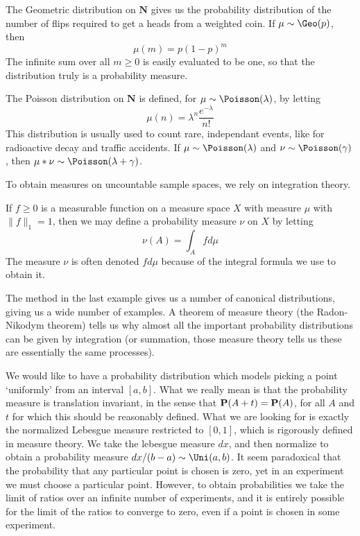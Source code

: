 \begin{example}
    The Geometric distribution on $\mathbf{N}$ gives us the probability distribution of the number of flips required to get a heads from a weighted coin. If $\mu \sim \Geo(p)$, then
    \[ \mu(m) = p (1-p)^m \]
    The infinite sum over all $m \geq 0$ is easily evaluated to be one, so that the distribution truly is a probability measure.
\end{example}

\begin{example}
    The Poisson distribution on $\mathbf{N}$ is defined, for $\mu \sim \Poisson(\lambda)$, by letting
    \[ \mu(n) = \lambda^n \frac{e^{-\lambda}}{n!} \]
    This distribution is usually used to count rare, independant events, like for radioactive decay and traffic accidents. If $\mu \sim \Poisson(\lambda)$ and $\nu \sim \Poisson(\gamma)$, then $\mu * \nu \sim \Poisson(\lambda + \gamma)$.
\end{example}

To obtain measures on uncountable sample spaces, we rely on integration theory.

\begin{example}
    If $f \geq 0$ is a measurable function on a measure space $X$ with measure $\mu$ with $\| f \|_1 = 1$, then we may define a probability measure $\nu$ on $X$ by letting
    \[ \nu(A) = \int_A f d\mu \]
    The measure $\nu$ is often denoted $f d\mu$ because of the integral formula we use to obtain it.
\end{example}

The method in the last example gives us a number of canonical distributions, giving us a wide number of examples. A theorem of measure theory (the Radon-Nikodym theorem) tells us why almost all the important probability distributions can be given by integration (or summation, those measure theory tells us these are essentially the same processes).

\begin{example}
    We would like to have a probability distribution which models picking a point `uniformly' from an interval $[a,b]$. What we really mean is that the probability measure is translation invariant, in the sense that $\mathbf{P}(A + t) = \mathbf{P}(A)$, for all $A$ and $t$ for which this should be reasonably defined. What we are looking for is exactly the normalized Lebesgue measure restricted to $[0,1]$, which is rigorously defined in measure theory. We take the lebesgue measure $dx$, and then normalize to obtain a probability measure $dx/(b-a) \sim \Uni(a,b)$. It seem paradoxical that the probability that any particular point is chosen is zero, yet in an experiment we must choose a particular point. However, to obtain probabilities we take the limit of ratios over an infinite number of experiments, and it is entirely possible for the limit of the ratios to converge to zero, even if a point is chosen in some experiment.
\end{example}

